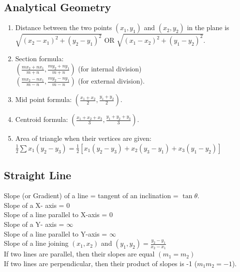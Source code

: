 \documentclass{article}
\begin{document}
\subsection*{Analytical Geometry}
\begin{enumerate}
\item Distance between the two points $(x_{1},y_{1})$ and $(x_{2},y_{2})$ in the plane is
$\sqrt{(x_{2}-x_{1})^{2}+(y_{2}-y_{1})^{2}}$ OR $\sqrt{(x_{1}-x_{2})^{2}+(y_{1}-y_{2})^{2}}$.
\item Section formula:\\
$(\frac{mx_{2}+nx_{1}}{m+n},\frac{my_{2}+ny_{1}}{m+n})$ (for internal division)
\\$(\frac{mx_{2}-nx_{1}}{m-n},\frac{my_{2}-ny_{1}}{m-n})$ (for external division).
\item Mid point formula:
$(\frac{x_{1}+x_{2}}{2},\frac{y_{1}+y_{2}}{2}).$
\item Centroid formula:
$(\frac{x_{1}+x_{2}+x_{3}}{3},\frac{y_{1}+y_{2}+y_{3}}{3}).$
\item Area of triangle when their vertices are given:
$\frac{1}{2}\sum x_{1}(y_{2}-y_{3}) = \frac{1}{2}[x_{1}(y_{2}-y_{3})+x_{2}(y_{3}-y_{1})+x_{3}(y_{1}-y_{2})]$
\end{enumerate}

\subsection*{Straight Line}
Slope (or Gradient) of a line = tangent of an inclination = $\tan\theta$.
\\Slope of a X- axis = 0
\\Slope of a line parallel to X-axis = 0
\\Slope of a Y- axis = $\infty$
\\Slope of a line parallel to Y-axis = $\infty$
\\Slope of a line joining $(x_{1},x_{2})$ and $(y_{1},y_{2})=\frac{y_{2}-y_{1}}{x_{2}-x_{1}}$
\\If two lines are parallel, then their slopes are equal $(m_{1}=m_{2})$
\\If two lines are perpendicular, then their product of slopes is -1 ($m_{1}m_{2}=-1$).
\end{document}
